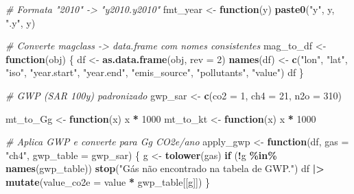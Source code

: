 \documentclass[
]{article}
\newenvironment{Shaded}{\begin{snugshade}}{\end{snugshade}}
\newcommand{\AttributeTok}[1]{\textcolor[rgb]{0.13,0.29,0.53}{#1}}
\newcommand{\CommentTok}[1]{\textcolor[rgb]{0.56,0.35,0.01}{\textit{#1}}}
\newcommand{\ControlFlowTok}[1]{\textcolor[rgb]{0.13,0.29,0.53}{\textbf{#1}}}
\newcommand{\DecValTok}[1]{\textcolor[rgb]{0.00,0.00,0.81}{#1}}
\newcommand{\FunctionTok}[1]{\textcolor[rgb]{0.13,0.29,0.53}{\textbf{#1}}}
\newcommand{\NormalTok}[1]{#1}
\newcommand{\OtherTok}[1]{\textcolor[rgb]{0.56,0.35,0.01}{#1}}
\newcommand{\SpecialCharTok}[1]{\textcolor[rgb]{0.81,0.36,0.00}{\textbf{#1}}}
\newcommand{\StringTok}[1]{\textcolor[rgb]{0.31,0.60,0.02}{#1}}
\begin{document}
\begin{Shaded}
\begin{Highlighting}[]
\CommentTok{\# Formata "2010" {-}\textgreater{} "y2010.y2010"}
\NormalTok{fmt\_year }\OtherTok{\textless{}{-}} \ControlFlowTok{function}\NormalTok{(y) }\FunctionTok{paste0}\NormalTok{(}\StringTok{"y"}\NormalTok{, y, }\StringTok{".y"}\NormalTok{, y)}

\CommentTok{\# Converte magclass {-}\textgreater{} data.frame com nomes consistentes}
\NormalTok{mag\_to\_df }\OtherTok{\textless{}{-}} \ControlFlowTok{function}\NormalTok{(obj) \{}
\NormalTok{  df }\OtherTok{\textless{}{-}} \FunctionTok{as.data.frame}\NormalTok{(obj, }\AttributeTok{rev =} \DecValTok{2}\NormalTok{)}
  \FunctionTok{names}\NormalTok{(df) }\OtherTok{\textless{}{-}} \FunctionTok{c}\NormalTok{(}\StringTok{"lon"}\NormalTok{, }\StringTok{"lat"}\NormalTok{, }\StringTok{"iso"}\NormalTok{, }\StringTok{"year.start"}\NormalTok{, }\StringTok{"year.end"}\NormalTok{, }\StringTok{"emis\_source"}\NormalTok{, }\StringTok{"pollutants"}\NormalTok{, }\StringTok{"value"}\NormalTok{)}
\NormalTok{  df}
\NormalTok{\}}

\CommentTok{\# GWP (SAR 100y) padronizado}
\NormalTok{gwp\_sar }\OtherTok{\textless{}{-}} \FunctionTok{c}\NormalTok{(}\AttributeTok{co2 =} \DecValTok{1}\NormalTok{, }\AttributeTok{ch4 =} \DecValTok{21}\NormalTok{, }\AttributeTok{n2o =} \DecValTok{310}\NormalTok{)}

\NormalTok{mt\_to\_Gg }\OtherTok{\textless{}{-}} \ControlFlowTok{function}\NormalTok{(x) x }\SpecialCharTok{*} \DecValTok{1000}
\NormalTok{mt\_to\_kt }\OtherTok{\textless{}{-}} \ControlFlowTok{function}\NormalTok{(x) x }\SpecialCharTok{*} \DecValTok{1000}

\CommentTok{\# Aplica GWP e converte para Gg CO2e/ano}
\NormalTok{apply\_gwp }\OtherTok{\textless{}{-}} \ControlFlowTok{function}\NormalTok{(df, }\AttributeTok{gas =} \StringTok{"ch4"}\NormalTok{, }\AttributeTok{gwp\_table =}\NormalTok{ gwp\_sar) \{}
\NormalTok{  g }\OtherTok{\textless{}{-}} \FunctionTok{tolower}\NormalTok{(gas)}
  \ControlFlowTok{if}\NormalTok{ (}\SpecialCharTok{!}\NormalTok{g }\SpecialCharTok{\%in\%} \FunctionTok{names}\NormalTok{(gwp\_table)) }\FunctionTok{stop}\NormalTok{(}\StringTok{"Gás não encontrado na tabela de GWP."}\NormalTok{)}
\NormalTok{  df }\SpecialCharTok{|\textgreater{}}
    \FunctionTok{mutate}\NormalTok{(}\AttributeTok{value\_co2e =}\NormalTok{ value }\SpecialCharTok{*}\NormalTok{ gwp\_table[[g]])}
\NormalTok{\}}


\end{Highlighting}
\end{Shaded}
\end{document}
